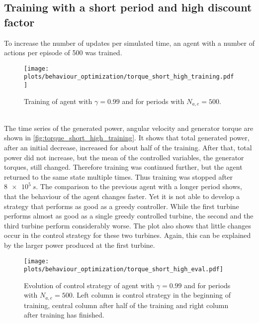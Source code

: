 \subsection{Training with a short period and high discount factor}
To increase the number of updates per simulated time, an agent with a number of actions per episode of 500 was trained.  
\begin{figure}[h]
	\centering
	\texttt{[image: plots/behaviour\_optimization/torque\_short\_high\_training.pdf]}
	\caption{Training of agent with $\gamma=0.99$ and for periods with $N_{a,e}=500$.}
	\label{fig:torque_short_high_training}
\end{figure}\\
The time series of the generated power, angular velocity and generator torque are shown in \autoref{fig:torque_short_high_training}. It shows that total generated power, after an initial decrease, increased for about half of the training. After that, total power did not increase, but the mean of the controlled variables, the generator torques, still changed. Therefore training was continued further, but the agent returned to the same state multiple times. Thus training was stopped after $\SI{8e5}{s}$. The comparison to the previous agent with a longer period shows, that the behaviour of the agent changes faster. Yet it is not able to develop a strategy that performs as good as a greedy controller. While the first turbine performs almost as good as a single greedy controlled turbine, the second and the third turbine perform considerably worse. The plot also shows that little changes occur in the control strategy for these two turbines. Again, this can be explained by the larger power produced at the first turbine. 
\begin{figure}[h]
	\centering
	\texttt{[image: plots/behaviour\_optimization/torque\_short\_high\_eval.pdf]}
	\caption{Evolution of control strategy of agent with $\gamma=0.99$ and for periods with $N_{a,e}=500$. Left column is control strategy in the beginning of training, central column after half of the training and right column after training has finished.}
	\label{fig:torque_short_high_eval}
\end{figure}
